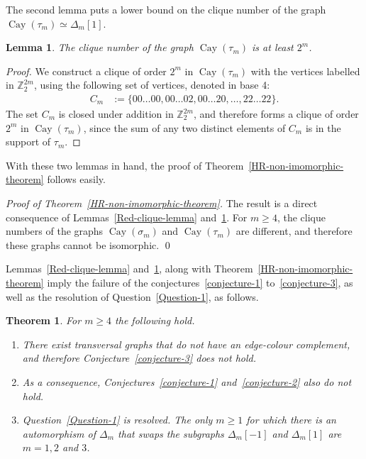 \documentclass[12pt,a4paper]{article}
\newcommand{\mb}[1]{\mathbb{#1}}
\newcommand{\Cay}{\operatorname{Cay}}
\newcommand{\Z}{\mb{Z}}
\newcommand{\isomorphic}{\simeq}
\newtheorem{Lemma}{Lemma}
\newtheorem{Theorem}{Theorem}
\newenvironment{proofof}[1]{\noindent\emph{Proof of #1.}}{\qed}
\begin{document}
The second lemma puts a lower bound on the clique number of the graph $\Cay(\tau_m) \isomorphic \varDelta_m[1]$.
\begin{Lemma}
\label{Blue-clique-lemma}
The clique number of the graph $\Cay(\tau_m)$ is at least $2^m$.
\end{Lemma}
\begin{proof}
We construct a clique of order $2^m$ in $\Cay(\tau_m)$ with the vertices labelled in $\Z_2^{2m}$,
using the following set of vertices, denoted in base 4:
\begin{align*}
C_m &:= \{ 00 \ldots 00, 00 \ldots 02, 00 \ldots 20, \ldots, 22 \ldots 22 \}.
\end{align*}
The set $C_m$ is closed under addition in $\Z_2^{2 m}$,
and therefore forms a clique of order $2^m$ in $\Cay(\tau_m)$,
since the sum of any two distinct elements of $C_m$ is in the support of $\tau_m$.
\end{proof}

With these two lemmas in hand, the proof of Theorem~\ref{HR-non-imomorphic-theorem} follows easily.

\begin{proofof}{Theorem~\ref{HR-non-imomorphic-theorem}}
The result is a direct consequence of Lemmas~\ref{Red-clique-lemma} and~\ref{Blue-clique-lemma}.
For $m \geqslant 4$, the clique numbers of the graphs $\Cay(\sigma_m)$ and $\Cay(\tau_m)$ are different,
and therefore these graphs cannot be isomorphic.
\end{proofof}

Lemmas~\ref{Red-clique-lemma} and~\ref{Blue-clique-lemma}, along with Theorem~\ref{HR-non-imomorphic-theorem}
imply the failure of the conjectures~\ref{conjecture-1} to~\ref{conjecture-3}, as well as the resolution of Question~\ref{Question-1}, as follows.
\begin{Theorem}
\label{Conjectures-are-false-theorem}
For $m \geqslant 4$ the following hold.
\begin{enumerate}
 \item
There exist transversal graphs that do not have an edge-colour complement, and
therefore Conjecture~\ref{conjecture-3} does not hold.
\item
As a consequence, Conjectures~\ref{conjecture-1} and~\ref{conjecture-2} also do not hold.
\item
Question~\ref{Question-1} is resolved.
The only $m \geqslant 1$ for which there is an automorphism of $\varDelta_m$
that swaps the subgraphs $\varDelta_m[-1]$ and $\varDelta_m[1]$
are $m=1,2$ and $3$.
\end{enumerate}

\end{Theorem}
\end{document}
